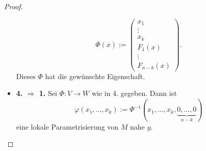 \documentclass[
 a4paper,
 12pt,
 parskip=half
 ]{scrartcl}
\theoremstyle{plain}
\theoremstyle{definition}
\numberwithin{equation}{section}
\begin{document}
\begin{proof}
\begin{itemize}
  \[ \Phi(x) := \begin{pmatrix} x_1 \\ \vdots \\ x_k \\ F_1(x) \\ \vdots \\ F_{n-k}(x) \end{pmatrix}. \]
  Dieses $\Phi$ hat die gewünschte Eigenschaft.%
  \item \textbf{4. $\Rightarrow$ 1.} Sei $\Phi\colon V \to W$ wie in 4. gegeben. Dann ist
  \[ \varphi(x_1, \ldots, x_k) := \Phi^{-1}( x_1, \ldots, x_k, \underbrace{0, \ldots, 0}_{n-k} ) \]
  eine lokale Parametrisierung von $M$ nahe $y$. \qedhere
 \end{itemize}

\end{proof}
\end{document}
